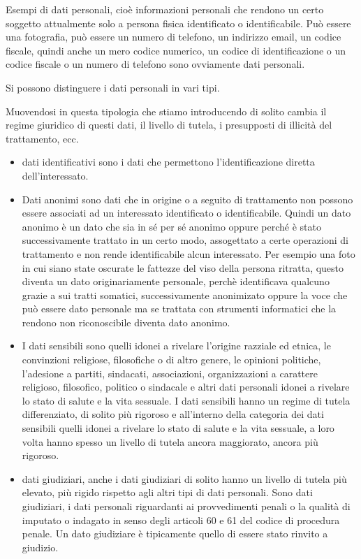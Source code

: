 Esempi di dati personali, cioè informazioni personali che rendono un certo soggetto attualmente solo a persona fisica identificato o identificabile. Può essere una fotografia, può essere un numero di telefono, un indirizzo email, un codice fiscale, quindi anche un mero codice numerico, un codice di identificazione o un codice fiscale o un numero di telefono sono ovviamente dati personali. 

Si possono distinguere i dati personali in vari tipi. 

Muovendosi in questa tipologia che stiamo introducendo di solito cambia il regime giuridico di questi dati, il livello di tutela, i presupposti di illicità del trattamento, ecc. 

\begin{itemize}
    \item dati identificativi sono i dati che permettono l'identificazione diretta dell'interessato.
    \item  Dati anonimi sono dati che in origine o a seguito di trattamento non possono essere associati ad un interessato identificato o identificabile. Quindi un dato anonimo è un dato che sia in sé per sé anonimo oppure perché è stato successivamente trattato in un certo modo, assogettato a certe operazioni di trattamento e non rende identificabile alcun interessato. Per esempio una foto in cui siano state oscurate le fattezze del viso della persona ritratta, questo diventa un dato originariamente personale, perchè identificava qualcuno grazie a sui tratti somatici, successivamente anonimizato oppure la voce che può essere dato personale ma se trattata con strumenti informatici che la rendono non riconoscibile diventa dato anonimo.
    \item I dati sensibili sono quelli idonei a rivelare l'origine razziale ed etnica, le convinzioni religiose, filosofiche o di altro genere, le opinioni politiche, l'adesione a partiti, sindacati, associazioni, organizzazioni a carattere religioso, filosofico, politico o sindacale e altri dati personali idonei a rivelare lo stato di salute e la vita sessuale. I dati sensibili hanno un regime di tutela differenziato, di solito più rigoroso e all'interno della categoria dei dati sensibili quelli idonei a rivelare lo stato di salute e la vita sessuale, a loro volta hanno spesso un livello di tutela ancora maggiorato, ancora più rigoroso.
    \item dati giudiziari, anche i dati giudiziari di solito hanno un livello di tutela più elevato, più rigido rispetto agli altri tipi di dati personali. Sono dati giudiziari, i dati personali riguardanti ai provvedimenti penali o la qualità di imputato o indagato in senso degli articoli 60 e 61 del codice di procedura penale. Un dato giudiziare è tipicamente quello di essere stato rinvito a giudizio.
\end{itemize}


